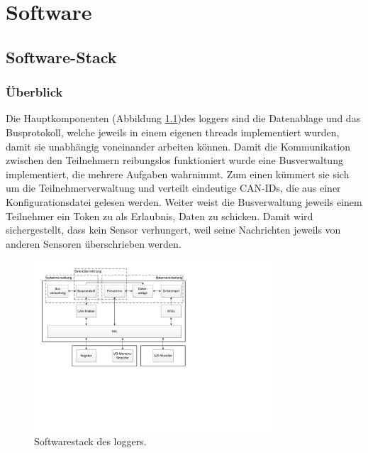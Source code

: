 %
%

\chapter{Software}\label{chap.software}

\section{Software-Stack}\label{sec.sw_stack}


\subsection{Überblick}\label{subsec.sw_ueberblick}
Die Hauptkomponenten (Abbildung \ref{fig.swlogger})des \gls{logger}s sind die Datenablage und das Busprotokoll, welche jeweils in einem eigenen \glspl{thread} implementiert wurden, damit sie unabhängig voneinander arbeiten können. Damit die Kommunikation zwischen den Teilnehmern reibungslos funktioniert wurde eine Busverwaltung implementiert, die mehrere Aufgaben wahrnimmt. Zum einen kümmert sie sich um die Teilnehmerverwaltung und verteilt eindeutige CAN-IDs, die aus einer Konfigurationsdatei gelesen werden. Weiter weist die Busverwaltung jeweils einem Teilnehmer ein Token zu als Erlaubnis, Daten zu schicken. Damit wird sichergestellt, dass kein Sensor verhungert, weil seine Nachrichten jeweils von anderen Sensoren überschrieben werden. 

\begin{figure}
	\centering
		\includegraphics[width=0.8\textwidth]{images/visio/Softwarestack_Logger.pdf}
	\caption{Softwarestack des \gls{logger}s.}
	\label{fig.swlogger}
\end{figure}

